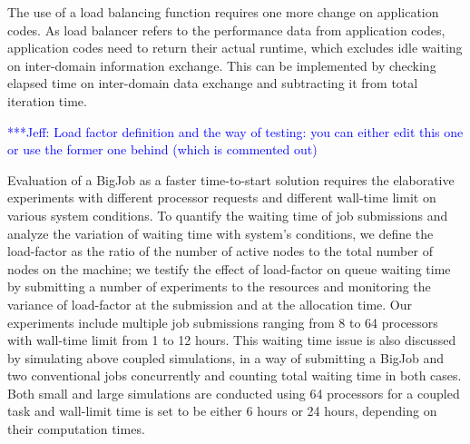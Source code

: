 \documentclass[conference,final]{IEEEtran}
\newcommand{\jhanote}[1]{ {\textcolor{red} { ***Jha: #1 }}}
\newcommand{\skonote}[1]{ {\textcolor{blue} { ***Jeff: #1 }}}
\newcommand{\jhanote}[1]{}
\newcommand{\skonote}[1]{}
\begin{document}
The use of a load balancing function requires one more change on
application codes. As load balancer refers to the performance data
from application codes, application codes need to return their actual
runtime, which excludes idle waiting on inter-domain information
exchange. This can be implemented by checking elapsed time on
inter-domain data exchange and subtracting it from total iteration
time.


\skonote{Load factor definition and the way of testing: you can either
  edit this one or use the former one behind (which is commented out)}

Evaluation of a BigJob as a faster time-to-start solution requires the
elaborative experiments with different processor requests and
different wall-time limit on various system conditions. To quantify
the waiting time of job submissions and analyze the variation of
waiting time with system's conditions, we define the load-factor as
the ratio of the number of active nodes to the total number of nodes
on the machine; we testify the effect of load-factor on queue waiting
time by submitting a number of experiments to the resources and
monitoring the variance of load-factor at the submission and at the
allocation time. Our experiments include multiple job submissions
ranging from 8 to 64 processors with wall-time limit from 1 to 12
hours. This waiting time issue is also discussed by simulating above
coupled simulations, in a way of submitting a BigJob and two
conventional jobs concurrently and counting total waiting time in both
cases. Both small and large simulations are conducted using 64
processors for a coupled task and wall-limit time is set to be either
6 hours or 24 hours, depending on their computation times.

\end{document}
